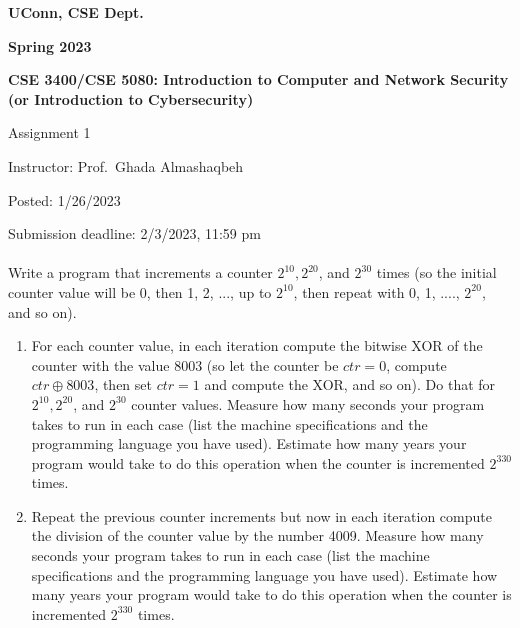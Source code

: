 \documentclass[12pt]{article}
\newcommand{\handout}[2]{
\renewcommand{\thepage}{\footnotesize CSE 3400/CSE 5850, #1, p. \arabic{page}}
\begin{center}

\noindent
{\bf UConn, CSE Dept.}

\noindent
{\bf Spring 2023}

\noindent
{\bf CSE 3400/CSE 5080: Introduction to Computer and Network Security \\(or Introduction to Cybersecurity)}
\end{center}

\begin{center}
{\Large #1}
\end{center}
}
\begin{document}
\handout{Assignment 1}{}

\noindent
{Instructor: Prof.~Ghada Almashaqbeh}

\noindent
{Posted: 1/26/2023}

\noindent
{Submission deadline: 2/3/2023, 11:59 pm} \\\\


Write a program that increments a counter $2^{10}, 2^{20}$, and $2^{30}$ times (so the initial counter value will be 0, then 1, 2, ..., up to $2^{10}$, then repeat with 0, 1, ...., $2^{20}$, and so on). 
\begin{enumerate}
\item For each counter value, in each iteration compute the bitwise XOR of the counter with the value 8003 (so let the counter be $ctr = 0$, compute $ctr \oplus 8003$, then set $ctr = 1$ and compute the XOR, and so on). Do that for $2^{10}, 2^{20}$, and $2^{30}$ counter values. Measure how many seconds your program takes to run in each case (list the machine specifications and the programming language you have used). Estimate how many years your program would take to do this operation when the counter is incremented $2^{330}$ times.

\item Repeat the previous counter increments but now in each iteration compute the division of the counter value by the number 4009. Measure how many seconds your program takes to run in each case (list the machine specifications and the programming language you have used). Estimate how many years your program would take to do this operation when the counter is incremented $2^{330}$ times. 
\end{enumerate}


\end{document}
